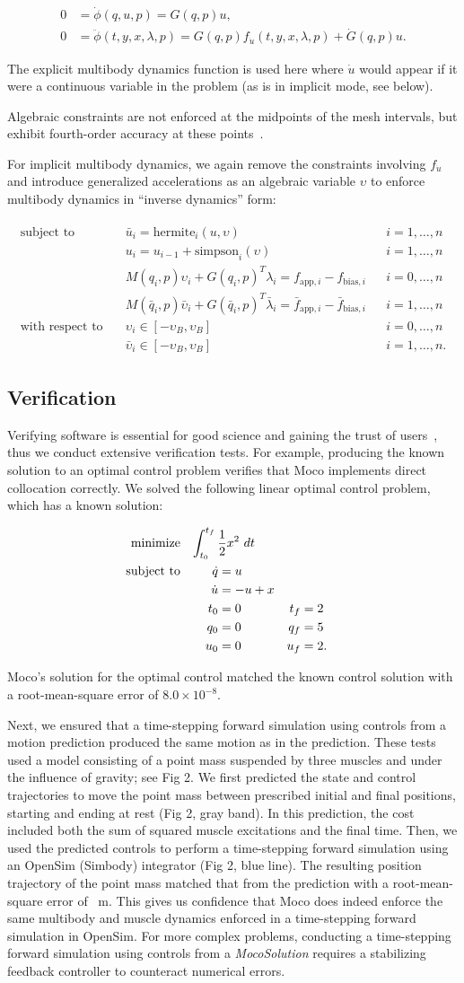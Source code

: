\documentclass[10pt,letterpaper]{article}
\newcommand{\hermitesimpsonkincon}{
    \begin{align}
         0 &= \dot{\phi}(q, u, p) = G(q, p) u,\\
         0 &= \ddot{\phi}(t, y, x, \lambda, p) = G(q, p) f_{\dot{u}}(t, y, x, \lambda, p) + \dot{G}(q, p) u.
    \end{align}
}
\newcommand{\hermitesimpsonimplicit}{
\begin{align}
    \begin{aligned}
    \mbox{subject to} \quad
         & \bar{u}_i = \textrm{hermite}_i(u, \upsilon) && i = 1, \ldots, n \\
         & u_i = u_{i-1} + \textrm{simpson}_i(\upsilon)  && i = 1, \ldots, n \\
         & M(q_i, p)\upsilon_i + G(q_i, p)^T \lambda_i =
          f_{\textrm{app},i} -
            f_{\textrm{bias},i} && i = 0, \ldots, n \\
         & M(\bar{q}_i, p)\bar{\upsilon}_i + G(\bar{q}_i, p)^T \bar{\lambda}_i =
          \bar{f}_{\textrm{app},i} -
            \bar{f}_{\textrm{bias},i} && i = 1, \ldots, n \\
    \mbox{with respect to} \quad
         & \upsilon_i \in [-\upsilon_{B}, \upsilon_{B}] && i = 0, \ldots, n \\
         & \bar{\upsilon}_i \in [-\upsilon_{B}, \upsilon_{B}] && i = 1, \ldots, n.
    \end{aligned}
\end{align}
}
\newcommand{\analytic}{
\begin{equation}
    \begin{aligned}
        \mbox{minimize} \quad
         \mathrlap{\int_{t_0}^{t_f} \frac{1}{2}x^2~dt}  \\
         \mbox{subject to} \quad
         && \dot{q} &= u \\
         && \dot{u} &= -u + x \\
         && t_0 &= 0 & t_f &= 2 \\
         && q_0 &= 0 & q_f &= 5 \\
         && u_0 &= 0 & u_f &= 2.
    \end{aligned}
\end{equation}
}
\begin{document}
\hermitesimpsonkincon

The explicit multibody dynamics function is used here where $ \dot{u} $ would appear if it were a continuous variable in the problem (as is in implicit mode, see below).

Algebraic constraints are not enforced at the midpoints of the mesh intervals, but exhibit fourth-order accuracy at these points~\cite{Posa:2016}.

For implicit multibody dynamics, we again remove the constraints involving $f_{\dot{u}}$ and introduce generalized accelerations as an algebraic variable $\upsilon$ to enforce multibody dynamics in “inverse dynamics” form:

\hermitesimpsonimplicit

\subsection*{Verification}

Verifying software is essential for good science and gaining the trust of users~\cite{Hicks:2015bo}, thus we conduct extensive verification tests. For example, producing the known solution to an optimal control problem verifies that Moco implements direct collocation correctly. We solved the following linear optimal control problem, which has a known solution:

\analytic

Moco’s solution for the optimal control matched the known control solution with a root-mean-square error of $8.0 \times 10^{-8}$.

Next, we ensured that a time-stepping forward simulation using controls from a motion prediction produced the same motion as in the prediction. These tests used a model consisting of a point mass suspended by three muscles and under the influence of gravity; see Fig 2. We first predicted the state and control trajectories to move the point mass between prescribed initial and final positions, starting and ending at rest (Fig 2, gray band). In this prediction, the cost included both the sum of squared muscle excitations and the final time. Then, we used the predicted controls to perform a time-stepping forward simulation using an OpenSim (Simbody) integrator (Fig 2, blue line). The resulting position trajectory of the point mass matched that from the prediction with a root-mean-square error of \unskip~m. This gives us confidence that Moco does indeed enforce the same multibody and muscle dynamics enforced in a time-stepping forward simulation in OpenSim. For more complex problems, conducting a time-stepping forward simulation using controls from a \textit{MocoSolution} requires a stabilizing feedback controller to counteract numerical errors.
\end{document}
